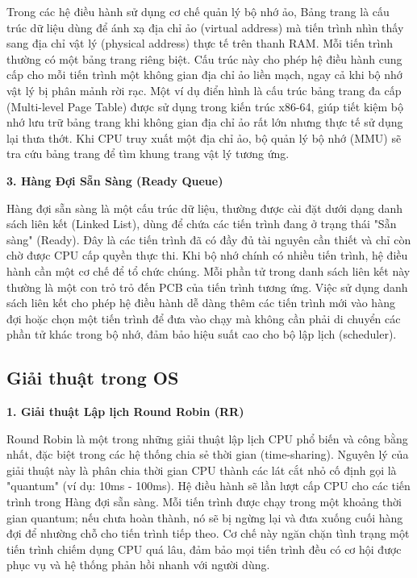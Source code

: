 \documentclass[a4paper,12pt]{article}
\begin{document}
Trong các hệ điều hành sử dụng cơ chế quản lý bộ nhớ ảo, Bảng trang là cấu trúc dữ liệu dùng để ánh xạ địa chỉ ảo (virtual address) mà tiến trình nhìn thấy sang địa chỉ vật lý (physical address) thực tế trên thanh RAM. Mỗi tiến trình thường có một bảng trang riêng biệt. Cấu trúc này cho phép hệ điều hành cung cấp cho mỗi tiến trình một không gian địa chỉ ảo liền mạch, ngay cả khi bộ nhớ vật lý bị phân mảnh rời rạc. Một ví dụ điển hình là cấu trúc bảng trang đa cấp (Multi-level Page Table) được sử dụng trong kiến trúc x86-64, giúp tiết kiệm bộ nhớ lưu trữ bảng trang khi không gian địa chỉ ảo rất lớn nhưng thực tế sử dụng lại thưa thớt. Khi CPU truy xuất một địa chỉ ảo, bộ quản lý bộ nhớ (MMU) sẽ tra cứu bảng trang để tìm khung trang vật lý tương ứng.

\textbf{3. Hàng Đợi Sẵn Sàng (Ready Queue)}

Hàng đợi sẵn sàng là một cấu trúc dữ liệu, thường được cài đặt dưới dạng danh sách liên kết (Linked List), dùng để chứa các tiến trình đang ở trạng thái "Sẵn sàng" (Ready). Đây là các tiến trình đã có đầy đủ tài nguyên cần thiết và chỉ còn chờ được CPU cấp quyền thực thi. Khi bộ nhớ chính có nhiều tiến trình, hệ điều hành cần một cơ chế để tổ chức chúng. Mỗi phần tử trong danh sách liên kết này thường là một con trỏ trỏ đến PCB của tiến trình tương ứng. Việc sử dụng danh sách liên kết cho phép hệ điều hành dễ dàng thêm các tiến trình mới vào hàng đợi hoặc chọn một tiến trình để đưa vào chạy mà không cần phải di chuyển các phần tử khác trong bộ nhớ, đảm bảo hiệu suất cao cho bộ lập lịch (scheduler).

\subsection{Giải thuật trong OS}

\textbf{1. Giải thuật Lập lịch Round Robin (RR)}

Round Robin là một trong những giải thuật lập lịch CPU phổ biến và công bằng nhất, đặc biệt trong các hệ thống chia sẻ thời gian (time-sharing). Nguyên lý của giải thuật này là phân chia thời gian CPU thành các lát cắt nhỏ cố định gọi là "quantum" (ví dụ: 10ms - 100ms). Hệ điều hành sẽ lần lượt cấp CPU cho các tiến trình trong Hàng đợi sẵn sàng. Mỗi tiến trình được chạy trong một khoảng thời gian quantum; nếu chưa hoàn thành, nó sẽ bị ngừng lại và đưa xuống cuối hàng đợi để nhường chỗ cho tiến trình tiếp theo. Cơ chế này ngăn chặn tình trạng một tiến trình chiếm dụng CPU quá lâu, đảm bảo mọi tiến trình đều có cơ hội được phục vụ và hệ thống phản hồi nhanh với người dùng.
\end{document}
